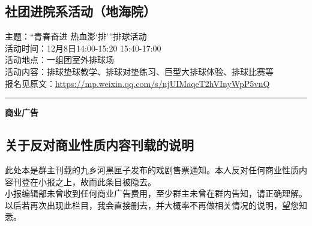 \documentclass[letterpaper, 12pt]{article}
\begin{document}
\begin{multicols}{2}
\section{社团进院系活动（地海院）}
主题：“青春奋进 热血澎‘排’”排球活动\\
活动时间：12月8日14:00-15:20 15:40-17:00\\
活动地点：一组团室外排球场\\
活动内容：排球垫球教学、排球对垫练习、巨型大排球体验、排球比赛等\\
报名见原文：\url{https://mp.weixin.qq.com/s/njUIMaqeT2hVInyWpP5vnQ}


\end{multicols} 
\hrule
\vspace{4mm}
\centerline{\huge\textbf{商业广告}}
\begin{multicols}{2}
\section{关于反对商业性质内容刊载的说明}
此处本是群主刊载的九乡河黑匣子发布的戏剧售票通知。本人反对任何商业性质内容刊登在小报之上，故而此条目被隐去。\\小报编辑部未曾收到任何商业广告费用，至少群主未曾在群内告知，请正确理解。\\以后若再次出现此栏目，我会直接删去，并大概率不再做相关情况的说明，望您知悉。

\end{multicols} 
\end{document}
